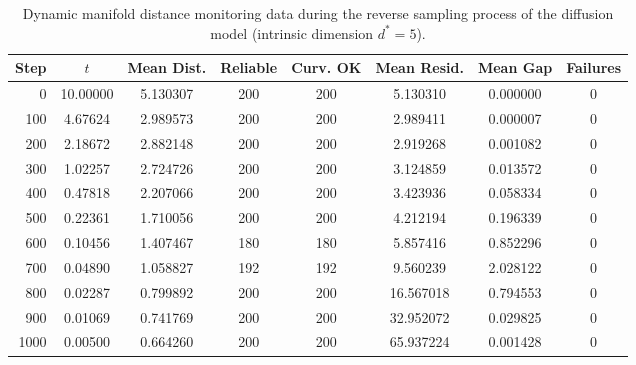\documentclass[11pt]{article}
\begin{document}
\begin{table}[htbp]
\centering

\label{tab:manifold_monitoring_d5}
\begin{tabular}{r c c c c c c c}
\toprule
Step & $t$ & Mean Dist. & Reliable & Curv. OK & Mean Resid. & Mean Gap & Failures \\
\midrule
0    & 10.00000 & 5.130307 & 200 & 200 & 5.130310  & 0.000000 & 0 \\
100  & 4.67624  & 2.989573 & 200 & 200 & 2.989411  & 0.000007 & 0 \\
200  & 2.18672  & 2.882148 & 200 & 200 & 2.919268  & 0.001082 & 0 \\
300  & 1.02257  & 2.724726 & 200 & 200 & 3.124859  & 0.013572 & 0 \\
400  & 0.47818  & 2.207066 & 200 & 200 & 3.423936  & 0.058334 & 0 \\
500  & 0.22361  & 1.710056 & 200 & 200 & 4.212194  & 0.196339 & 0 \\
600  & 0.10456  & 1.407467 & 180 & 180 & 5.857416  & 0.852296 & 0 \\
700  & 0.04890  & 1.058827 & 192 & 192 & 9.560239  & 2.028122 & 0 \\
800  & 0.02287  & 0.799892 & 200 & 200 & 16.567018 & 0.794553 & 0 \\
900  & 0.01069  & 0.741769 & 200 & 200 & 32.952072 & 0.029825 & 0 \\
1000 & 0.00500  & 0.664260 & 200 & 200 & 65.937224 & 0.001428 & 0 \\
\bottomrule
\end{tabular}
\vspace{0.5em}
\caption{Dynamic manifold distance monitoring data during the reverse sampling process of the diffusion model (intrinsic dimension $d^*=5$).}
\end{table}
\end{document}
